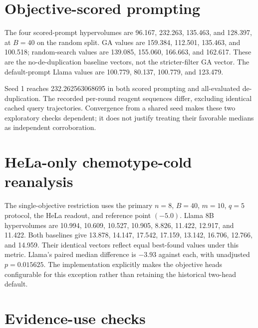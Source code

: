 \section{Objective-scored prompting}
\label{app:v3scored}
The four scored-prompt hypervolumes are 96.167, 232.263, 135.463, and 128.397, at $B=40$ on the random split. GA values are 159.384, 112.501, 135.463, and 100.518; random-search values are 139.085, 155.060, 166.663, and 162.617. These are the no-de-duplication baseline vectors, not the stricter-filter GA vector. The default-prompt Llama values are 100.779, 80.137, 100.779, and 123.479.

Seed 1 reaches 232.262563068695 in both scored prompting and all-evaluated de-duplication. The recorded per-round reagent sequences differ, excluding identical cached query trajectories. Convergence from a shared seed makes these two exploratory checks dependent; it does not justify treating their favorable medians as independent corroboration.

\section{HeLa-only chemotype-cold reanalysis}
\label{app:helaonly}
The single-objective restriction uses the primary $n=8$, $B=40$, $m=10$, $q=5$ protocol, the HeLa readout, and reference point $(-5.0)$. Llama 8B hypervolumes are 10.994, 10.609, 10.527, 10.905, 8.826, 11.422, 12.917, and 11.422. Both baselines give 13.878, 14.147, 17.542, 17.159, 13.142, 16.706, 12.766, and 14.959. Their identical vectors reflect equal best-found values under this metric. Llama's paired median difference is $-3.93$ against each, with unadjusted $p=0.015625$. The implementation explicitly makes the objective heads configurable for this exception rather than retaining the historical two-head default.

\section{Evidence-use checks}
\label{app:leakage8b}
